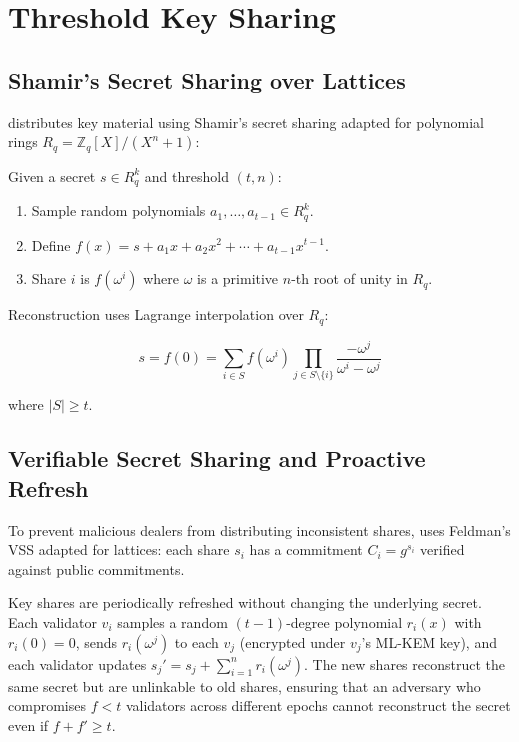 \section{Threshold Key Sharing}


\subsection{Shamir's Secret Sharing over Lattices}

\KChain{} distributes key material using Shamir's secret sharing adapted for polynomial rings $R_q = \mathbb{Z}_q[X]/(X^n + 1)$:

\begin{definition}
Given a secret $s \in R_q^k$ and threshold $(t, n)$:
\begin{enumerate}
\item Sample random polynomials $a_1, \ldots, a_{t-1} \in R_q^k$.
\item Define $f(x) = s + a_1 x + a_2 x^2 + \cdots + a_{t-1} x^{t-1}$.
\item Share $i$ is $f(\omega^i)$ where $\omega$ is a primitive $n$-th root of unity in $R_q$.
\end{enumerate}
\end{definition}

Reconstruction uses Lagrange interpolation over $R_q$:

\begin{equation}
s = f(0) = \sum_{i \in S} f(\omega^i) \prod_{j \in S \setminus \{i\}} \frac{-\omega^j}{\omega^i - \omega^j}
\end{equation}

where $|S| \geq t$.

\subsection{Verifiable Secret Sharing and Proactive Refresh}

To prevent malicious dealers from distributing inconsistent shares, \KChain{} uses Feldman's VSS \cite{feldman1987practical} adapted for lattices: each share $s_i$ has a commitment $C_i = g^{s_i}$ verified against public commitments.

Key shares are periodically refreshed without changing the underlying secret. Each validator $v_i$ samples a random $(t-1)$-degree polynomial $r_i(x)$ with $r_i(0) = 0$, sends $r_i(\omega^j)$ to each $v_j$ (encrypted under $v_j$'s ML-KEM key), and each validator updates $s_j' = s_j + \sum_{i=1}^{n} r_i(\omega^j)$. The new shares reconstruct the same secret but are unlinkable to old shares, ensuring that an adversary who compromises $f < t$ validators across different epochs cannot reconstruct the secret even if $f + f' \geq t$.

